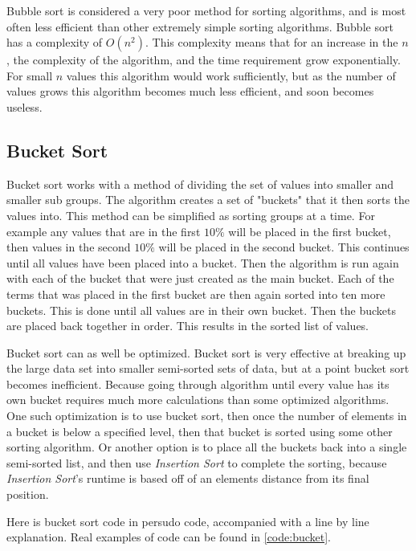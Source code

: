 \documentclass{article}
\begin{document}
\begin{multicols}{2}
Bubble sort is considered a very poor method for sorting algorithms, and is most often less efficient than other extremely simple sorting algorithms. Bubble sort has a complexity of $O(n^2)$. This complexity means that for an increase in the $n$, the complexity of the algorithm, and the time requirement grow exponentially. For small $n$ values this algorithm would work sufficiently, but as the number of values grows this algorithm becomes much less efficient, and soon becomes useless.
\end{multicols}


\subsection{Bucket Sort}
\begin{multicols}{2}
Bucket sort works with a method of dividing the set of values into smaller and smaller sub groups. The algorithm creates a set of "buckets" that it then sorts the values into. This method can be simplified as sorting groups at a time. For example any values that are in the first $10\%$ will be placed in the first bucket, then values in the second $10\%$ will be placed in the second bucket. This continues until all values have been placed into a bucket. Then the algorithm is run again with each of the bucket that were just created as the main bucket. Each of the terms that was placed in the first bucket are then again sorted into ten more buckets. This is done until all values are in their own bucket. Then the buckets are placed back together in order. This results in the sorted list of values.

Bucket sort can as well be optimized. Bucket sort is very effective at breaking up the large data set into smaller semi-sorted sets of data, but at a point bucket sort becomes inefficient. Because going through algorithm until every value has its own bucket requires much more calculations than some optimized algorithms. One such optimization is to use bucket sort, then once the number of elements in a bucket is below a specified level, then that bucket is sorted using some other sorting algorithm. Or another option is to place all the buckets back into a single semi-sorted list, and then use \textit{Insertion Sort} to complete the sorting, because \textit{Insertion Sort}'s runtime is based off of an elements distance from its final position.

Here is bucket sort code in persudo code, accompanied with a line by line explanation. Real examples of code can be found in \ref{code:bucket}.
\end{multicols}
\end{document}
